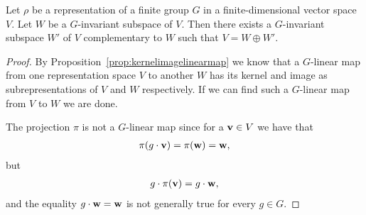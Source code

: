 \begin{proposition}\label{prop:complsubrepr}
	Let $\rho$ be a representation of a finite group $G$ in a finite-dimensional vector space $V$. Let $W$ be a $G$-invariant subspace of $V$. Then there exists a $G$-invariant subspace $W'$ of $V$ complementary to $W$ such that $V = W \oplus W'$.
\end{proposition}
\begin{proof}
	By Proposition~\ref{prop:kernelimagelinearmap} we know that a $G$-linear map from one representation space $V$ to another $W$ has its kernel and image as subrepresentations of $V$ and $W$ respectively. If we can find such a $G$-linear map from $V$ to $W$ we are done.
	
	The projection $\pi$ is not a $G$-linear map since for a $\mathbf{v} \in V$ we have that 
	\begin{align*}
		\pi(g \cdot \mathbf{v}) = \pi(\mathbf{w}) = \mathbf{w},
	\end{align*}
	but 
	\begin{align*}
		g \cdot \pi(\mathbf{v}) = g \cdot \mathbf{w},
	\end{align*}
	and the equality $g \cdot \mathbf{w} = \mathbf{w}$ is not generally true for every $g \in G$.
	

\end{proof}
